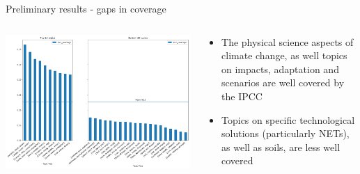 \documentclass[9pt]{beamer}
\begin{document}
\begin{frame}{Preliminary results - gaps in coverage}

\begin{columns}
	\begin{column}{0.7\linewidth}
		\begin{center}
			\includegraphics[width=\linewidth]{../plots/ipcc_topics_654.png}
		\end{center}
	\end{column}
	\begin{column}{0.3\linewidth}
		\begin{center}
			\begin{itemize}
				\item The physical science aspects of climate change, as well topics on impacts, adaptation and scenarios are well covered by the IPCC
				\item Topics on specific technological solutions (particularly NETs), as well as soils, are less well covered
			\end{itemize}
		\end{center}
	\end{column}
\end{columns}

\end{frame}
\end{document}
